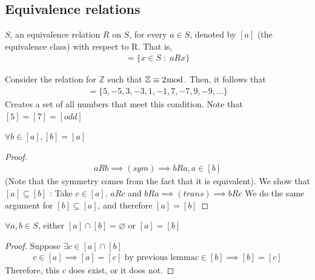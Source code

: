 \documentclass[a4paper]{article}
\theoremstyle{plain}
\newtheorem{lem}[thm]{Lemma}
\theoremstyle{definition}
\newtheorem{exmp}{Example}[section]
\theoremstyle{remark}
\begin{document}
\subsection{Equivalence relations}
$S$, an equivalence relation $R$ on $S$, for every $a \in S$, denoted by $[a]$ (the equivalence class) with respect to R. That is,
\begin{align*}
	[a] = \{ x \in S\; : \; aRx \}
\end{align*}
\begin{tcolorbox}[colback=black!3!white,colframe=black!60!white,title=\begin{exmp}Example 1 \label{Example 1}\end{exmp}]
Consider the relation for $\mathbb{Z}$ such that $\mathbb{Z}  \equiv 2 \bmod  $. Then, it follows that
\begin{align}
	[5] = \{5,-5,3,-3,1,-1,7,-7,9,-9,\ldots\}
\end{align}
Creates a set of all numbers that meet this condition. Note that $[5]=[7]=[odd]$
\end{tcolorbox}
\begin{tcolorbox}[colback=black!3!white,colframe=black!60!white,title=\begin{lem}Equivalence Class representatives \label{Equivalence Class representatives}\end{lem}]
$\forall  b \in [a], [b]=[a]$ 
\begin{proof}

	\begin{align}
		aRb \implies (sym) \implies bRa, a \in [b]
	\end{align}
	(Note that the symmetry comes from the fact that it is equivalent). We show that $[a] \subseteq [b]$ : Take $c \in [a]$. 
	$aRc$ and $bRa \implies (trans) \implies bRc$
	We do the same argument for $[b] \subseteq [a]$, and therefore $[a]=[b]$
\end{proof}
\end{tcolorbox}
\begin{tcolorbox}[colback=black!3!white,colframe=black!60!white,title=\begin{lem}Overlap or Coincision \label{Overlap or Coincision}\end{lem}]
$\forall a,b \in S$, either $[a] \cap [b]=\varnothing$ or $[a]=[b]$
\begin{proof}
	Suppose $\exists c \in [a] \cap [b]$	
	\begin{align}
		c \in [a] \implies [a]=[c] \text{ by previous lemma}
		c \in [b] \implies [b]=[c]
	\end{align}
	Therefore, this $c$ does exist, or it does not.
\end{proof}
\end{tcolorbox}
\end{document}
